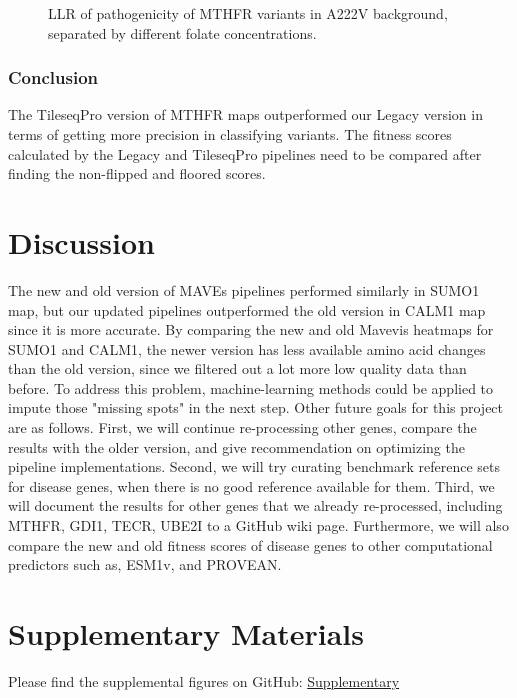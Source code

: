 \documentclass{article}
\begin{document}
\begin{figure}[H]
    \qquad
    \caption{LLR of pathogenicity of MTHFR variants in A222V background, separated by different folate concentrations.}%
    \label{fig:LLR MTHFR}%
\end{figure}


\subsubsection{Conclusion}
The TileseqPro version of MTHFR maps outperformed our Legacy version in terms of getting more precision in classifying variants. The fitness scores calculated by the Legacy and TileseqPro pipelines need to be compared after finding the non-flipped and floored scores. 




\newpage
\section{Discussion}
The new and old version of MAVEs pipelines performed similarly in SUMO1 map, but our updated pipelines outperformed the old version in CALM1 map since it is more accurate. By comparing the new and old Mavevis heatmaps for SUMO1 and CALM1, the newer version has less available amino acid changes than the old version, since we filtered out a lot more low quality data than before. To address this problem, machine-learning methods could be applied to impute those "missing spots" in the next step. Other future goals for this project are as follows. First, we will continue re-processing other genes, compare the results with the older version, and give recommendation on optimizing the pipeline implementations. Second, we will try curating benchmark reference sets for disease genes, when there is no good reference available for them. Third, we will document the results for other genes that we already re-processed, including MTHFR, GDI1, TECR, UBE2I to a GitHub wiki page. Furthermore, we will also compare the new and old fitness scores of disease genes to other computational predictors such as, ESM1v\cite{lin2023evolutionary}, and PROVEAN\cite{sandell_fitness_2022}.




\section{Supplementary Materials}
Please find the supplemental figures on GitHub: \href{https://github.com/Bilin22/Tileseq-Score-Comparison/blob/main/BCB330/supplementary.pdf}{Supplementary}


\newpage


\end{document}
